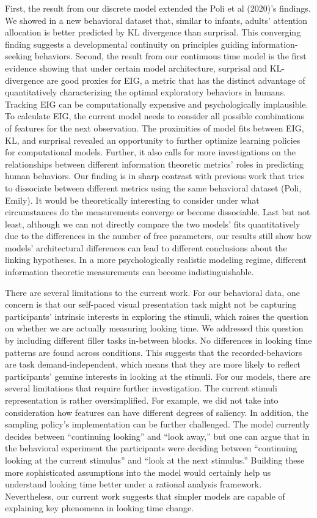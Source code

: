 \documentclass[10pt, letterpaper]{article}
\begin{document}
First, the result from our discrete model extended the Poli et al
(2020)'s findings. We showed in a new behavioral dataset that, similar
to infants, adults' attention allocation is better predicted by KL
divergence than surprisal. This converging finding suggests a
developmental continuity on principles guiding information-seeking
behaviors. Second, the result from our continuous time model is the
first evidence showing that under certain model architecture, surprisal
and KL-divergence are good proxies for EIG, a metric that has the
distinct advantage of quantitatively characterizing the optimal
exploratory behaviors in humans. Tracking EIG can be computationally
expensive and psychologically implausible. To calculate EIG, the current
model needs to consider all possible combinations of features for the
next observation. The proximities of model fits between EIG, KL, and
surprisal revealed an opportunity to further optimize learning policies
for computational models. Further, it also calls for more investigations
on the relationships between different information theoretic metrics'
roles in predicting human behaviors. Our finding is in sharp contrast
with previous work that tries to dissociate between different metrics
using the same behavioral dataset (Poli, Emily). It would be
theoretically interesting to consider under what circumstances do the
measurements converge or become dissociable. Last but not least,
although we can not directly compare the two models' fits quantitatively
due to the differences in the number of free parameters, our results
still show how models' architectural differences can lead to different
conclusions about the linking hypotheses. In a more psychologically
realistic modeling regime, different information theoretic measurements
can become indistinguishable.

There are several limitations to the current work. For our behavioral
data, one concern is that our self-paced visual presentation task might
not be capturing participants' intrinsic interests in exploring the
stimuli, which raises the question on whether we are actually measuring
looking time. We addressed this question by including different filler
tasks in-between blocks. No differences in looking time patterns are
found across conditions. This suggests that the recorded-behaviors are
task demand-independent, which means that they are more likely to
reflect participants' genuine interests in looking at the stimuli. For
our models, there are several limitations that require further
investigation. The current stimuli representation is rather
oversimplified. For example, we did not take into consideration how
features can have different degrees of saliency. In addition, the
sampling policy's implementation can be further challenged. The model
currently decides between ``continuing looking'' and ``look away,'' but
one can argue that in the behavioral experiment the participants were
deciding between ``continuing looking at the current stimulus'' and
``look at the next stimulus.'' Building these more sophisticated
assumptions into the model would certainly help us understand looking
time better under a rational analysis framework. Nevertheless, our
current work suggests that simpler models are capable of explaining key
phenomena in looking time change.
\end{document}
